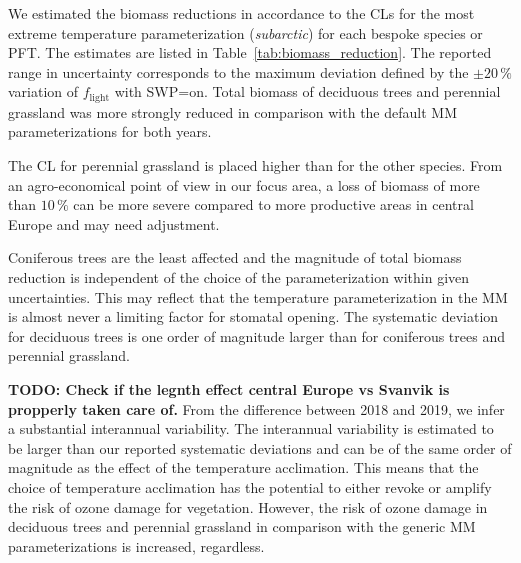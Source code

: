 \documentclass[bg, manuscript]{copernicus}
\begin{document}
We estimated the biomass reductions in accordance to the CLs \citep{ICP:MappingManual2017, ESPR:Hayes2021} for the most extreme temperature parameterization (\emph{subarctic}) for each bespoke species or PFT. The estimates are listed in Table~\ref{tab:biomass_reduction}. The reported range in uncertainty corresponds to the maximum deviation defined by the $\pm 20\,\unit{\%}$ variation of $f_\mathrm{light}$ with SWP=on. Total biomass of deciduous trees and perennial grassland was more strongly reduced in comparison with the default MM parameterizations for both years. 

The CL for perennial grassland is placed higher than for the other species. From an agro-economical point of view in our focus area, a loss of biomass of more than $10\,\unit{\%}$ can be more severe compared to more productive areas in central Europe and may need adjustment.

Coniferous trees are the least affected and the magnitude of total biomass reduction is independent of the choice of the parameterization within given uncertainties. This may reflect that the temperature parameterization in the MM is almost never a limiting factor for stomatal opening. The systematic deviation for deciduous trees is one order of magnitude larger than for coniferous trees and perennial grassland.

\textbf{TODO: Check if the legnth effect central Europe vs Svanvik is propperly taken care of.}
From the difference between 2018 and 2019, we infer a substantial interannual variability. The interannual variability is estimated to be larger than our reported systematic deviations and can be of the same order of magnitude as the effect of the temperature acclimation. This means that the choice of temperature acclimation has the potential to either revoke or amplify the risk of ozone damage for vegetation. However, the risk of ozone damage in deciduous trees and perennial grassland in comparison with the generic MM parameterizations is increased, regardless.
\end{document}
